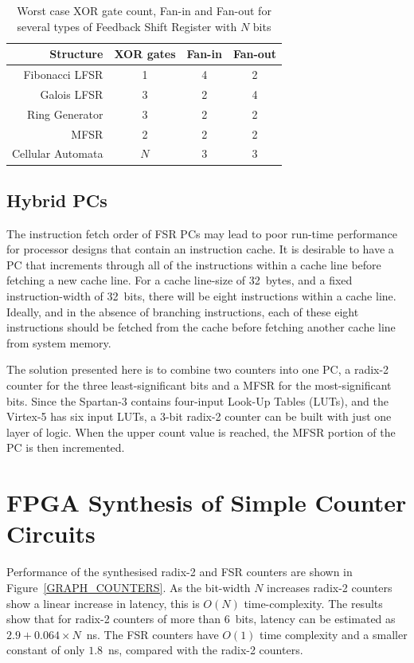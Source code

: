 \documentclass[5p, twocolumn]{elsarticle}
\begin{document}
\begin{table}
\begin{center}
\begin{tabular}{r|ccc}
Structure & XOR gates & Fan-in & Fan-out \\
\hline
Fibonacci LFSR & 1 & 4 & 2 \\
Galois LFSR & 3 & 2 & 4 \\
Ring Generator & 3 & 2 & 2 \\
MFSR & 2 & 2 & 2 \\
Cellular Automata & $N$ & 3 & 3 \\
\end{tabular}
\caption{Worst case XOR gate count, Fan-in and Fan-out for several types of
Feedback Shift Register with $N$ bits}
\label{fsr_table}
\end{center}
\end{table}


\subsection{Hybrid PCs}
\label{PC_HYBRID}

The instruction fetch order of FSR PCs may lead to poor run-time performance for
processor designs that contain an instruction cache. It is desirable to have a PC
that increments through all of the instructions within a cache line before
fetching a new cache line. For a cache line-size of 32~bytes, and a fixed
instruction-width of 32~bits, there will be eight instructions within a cache
line. Ideally, and in the absence of branching instructions, each of these eight
instructions should be fetched from the cache before fetching another cache line
from system memory.

The solution presented here is to combine two counters into one PC, a radix-2
counter for the three least-significant bits and a MFSR for the most-significant
bits. Since the Spartan-3 contains four-input Look-Up Tables (LUTs), and the
Virtex-5 has six input LUTs, a 3-bit radix-2 counter can be built with just one
layer of logic. When the upper count value is reached, the MFSR portion of the PC
is then incremented.


\section{FPGA Synthesis of Simple Counter Circuits}

Performance of the synthesised radix-2 and FSR counters are shown in
Figure~\ref{GRAPH_COUNTERS}. As the bit-width $N$ increases radix-2 counters show
a linear increase in latency, this is $O(N)$ time-complexity. The results show
that for radix-2 counters of more than 6~bits, latency can be estimated as
$2.9+0.064 \times N$~ns. The FSR counters have $O(1)$ time complexity and a
smaller constant of only $1.8$~ns, compared with the radix-2 counters.
\end{document}
